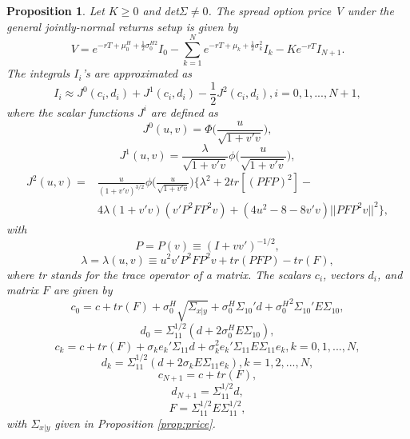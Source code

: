 \documentclass[a4paper]{article}
\newtheorem{prop}{Proposition}
\begin{document}
\begin{prop}
\label{prop:approx2}
Let $K\geq0$ and det$\Sigma \neq 0$. The spread option price V under the general jointly-normal returns setup is given by
\begin{equation}
\label{eq:cf2}
V=e^{-rT+\mu_0^H+\frac{1}{2}\sigma_0^{H2}}I_0-\sum_{k=1}^Ne^{-rT+\mu_k+\frac{1}{2}\sigma_k^2}I_k-Ke^{-rT}I_{N+1}.
\end{equation}
The integrals $I_i$'s are approximated as
$$I_i\approx J^0(c_i,d_i)+J^1(c_i,d_i)-\frac{1}{2}J^2(c_i,d_i), i=0,1,...,N+1,$$
where the scalar functions $J^i$ are defined as
\begin{equation}
\label{eq:j0}
J^0(u,v)=\Phi\Big(\frac{u}{\sqrt{1+v'v}}\Big),
\end{equation}
\begin{equation}
\label{eq:j1}
J^1(u,v)=\frac{\lambda}{\sqrt{1+v'v}}\phi\Big(\frac{u}{\sqrt{1+v'v}}\Big),
\end{equation}
\begin{equation}
\label{eq:j2}
\begin{split}
J^2(u,v)=&\frac{u}{(1+v'v)^{3/2}}\phi\Big(\frac{u}{\sqrt{1+v'v}}\Big)\Big\{\lambda^2+2tr[(PFP)^2]- \\
	&4\lambda(1+v'v)(v'P^2FP^2v)+(4u^2-8-8v'v)||PFP^2v||^2\Big\},
\end{split}
\end{equation}
with
\begin{equation}
\label{eq:p}
P=P(v)\equiv(I+vv')^{-1/2},
\end{equation}
\begin{equation}
\lambda=\lambda(u,v)\equiv u^2v'P^2FP^2v+tr(PFP)-tr(F),
\end{equation}
where tr stands for the trace operator of a matrix. The scalars $c_i$, vectors $d_i$, and matrix $F$ are given by
\begin{equation}
c_0=c+tr(F)+\sigma_0^H\sqrt{\Sigma_{x|y}}+\sigma_0^H\Sigma_{10}'d+{\sigma_0^H}^2\Sigma_{10}'E\Sigma_{10},
\end{equation}
\begin{equation}
\label{eq:d0}
d_0=\Sigma_{11}^{1/2}(d+2\sigma_0^HE\Sigma_{10}),
\end{equation}
\begin{equation}
c_k=c+tr(F)+\sigma_ke_k'\Sigma_{11}d+\sigma_k^2e_k'\Sigma_{11}E\Sigma_{11}e_k,k=0,1,...,N,
\end{equation}
\begin{equation}
\label{eq:dk}
d_k=\Sigma_{11}^{1/2}(d+2\sigma_kE\Sigma_{11}e_k),k=1,2,...,N,
\end{equation}
\begin{equation}
c_{N+1}=c+tr(F),
\end{equation}
\begin{equation}
\label{eq:dN1}
d_{N+1}=\Sigma_{11}^{1/2}d,
\end{equation}
\begin{equation}
F=\Sigma_{11}^{1/2}E\Sigma_{11}^{1/2},
\end{equation}
with $\Sigma_{x|y}$ given in Proposition \ref{prop:price}.

\end{prop}
\end{document}
